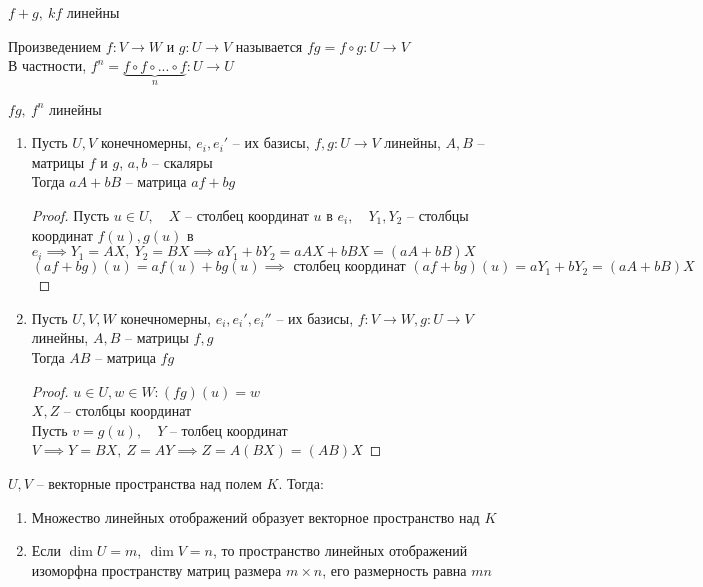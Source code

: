 \begin{remark}
	$ f + g, ~ kf $ линейны
\end{remark}

\begin{definition}
	Произведением $ f : V \to W $ и $ g : U \to V $ называется $ fg = f \circ g : U \to V $ \\
    В частности, $ f^n = \underbrace{f \circ f \circ ... \circ f}_n : U \to U $
\end{definition}

\begin{remark}
	$ fg, ~ f^n $ линейны
\end{remark}

\begin{lemma}
	\hfill
    \begin{enumerate}
    	\item Пусть $ U, V $ конечномерны, $ e_i, e_i' $ -- их базисы, $f, g : U \to V $ линейны, $ A, B $ -- матрицы $ f $ и $ g $, $ a, b $ -- скаляры \\
        Тогда $ aA + bB $ -- матрица $ af + bg $
        \begin{proof}
        	Пусть $ u \in U, \quad X $ -- столбец координат $ u $ в $ e_i, \quad Y_1, Y_2 $ -- столбцы координат $ f(u), g(u) $ в $ e_i \implies Y_1 = AX, ~ Y_2 = BX \implies aY_1 + bY_2 = aAX + bBX = (aA + bB)X $
            $$ (af + bg)(u) = af(u) + bg(u) \implies \text{ столбец координат } (af + bg)(u) = aY_1 + bY_2 = (aA + bB)X $$
        \end{proof}
        \item Пусть $ U, V, W $ конечномерны, $ e_i, e_i', e_i'' $ -- их базисы, $ f : V \to W, g : U \to V $ линейны, $ A, B $ -- матрицы $ f, g $ \\
        Тогда $ AB $ -- матрица $ fg $
        \begin{proof}
        	$ u \in U, w \in W : (fg)(u) = w $ \\
            $ X, Z $ -- столбцы координат \\
            Пусть $ v = g(u), \quad Y $ -- толбец координат $ V \implies Y = BX, ~ Z = AY \implies Z = A(BX) = (AB)X $
        \end{proof}
    \end{enumerate}
\end{lemma}

\begin{theorem}
	$ U, V $ -- векторные пространства над полем $ K $. Тогда:
    \begin{enumerate}
    	\item Множество линейных отображений образует векторное пространство над $ K $
        \item Если $ \dim U = m, ~ \dim V = n $, то пространство линейных отображений изоморфна пространству матриц размера $ m \times n $, его размерность равна $ mn $
    \end{enumerate}
\end{theorem}
